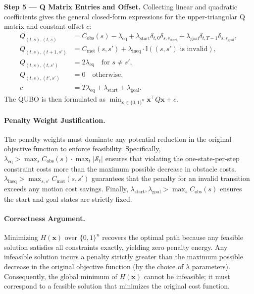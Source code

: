 \documentclass[12pt]{article}
\begin{document}
\textbf{Step 5 --- Q Matrix Entries and Offset.} Collecting linear and quadratic coefficients gives the general closed-form expressions for the upper-triangular Q matrix and constant offset $c$:
\begin{align}
Q_{(t,s),(t,s)} &= C_{\text{obs}}(s) - \lambda_{\text{eq}} + \lambda_{\text{start}} \delta_{t,0} \delta_{s, s_{\text{start}}} + \lambda_{\text{goal}} \delta_{t,T-1} \delta_{s, s_{\text{goal}}}, \\
Q_{(t,s),(t+1,s')} &= C_{\text{mot}}(s,s') + \lambda_{\text{ineq}} \cdot \mathbb{I}((s,s') \text{ is invalid}), \\
Q_{(t,s),(t,s')} &= 2\lambda_{\text{eq}} \quad \text{for } s \neq s', \\
Q_{(t,s),(t',s')} &= 0 \quad \text{otherwise}, \\
c &= T\lambda_{\text{eq}} + \lambda_{\text{start}} + \lambda_{\text{goal}}.
\end{align}
The QUBO is then formulated as $\min_{\mathbf{x} \in \{0,1\}^n} \mathbf{x}^\top Q \mathbf{x} + c$.

\paragraph{Penalty Weight Justification.}
The penalty weights must dominate any potential reduction in the original objective function to enforce feasibility. Specifically, $\lambda_{\text{eq}} > \max_{s} C_{\text{obs}}(s) \cdot \max_{t} |\mathcal{S}_t|$ ensures that violating the one-state-per-step constraint costs more than the maximum possible decrease in obstacle costs. $\lambda_{\text{ineq}} > \max_{s,s'} C_{\text{mot}}(s,s')$ guarantees that the penalty for an invalid transition exceeds any motion cost savings. Finally, $\lambda_{\text{start}}, \lambda_{\text{goal}} > \max_{s} C_{\text{obs}}(s)$ ensures the start and goal states are strictly fixed.

\paragraph{Correctness Argument.}
Minimizing $H(\mathbf{x})$ over $\{0,1\}^n$ recovers the optimal path because any feasible solution satisfies all constraints exactly, yielding zero penalty energy. Any infeasible solution incurs a penalty strictly greater than the maximum possible decrease in the original objective function (by the choice of $\lambda$ parameters). Consequently, the global minimum of $H(\mathbf{x})$ cannot be infeasible; it must correspond to a feasible solution that minimizes the original cost function.
\end{document}
